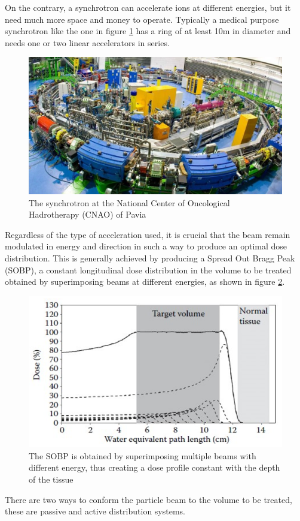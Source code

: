 On the contrary, a synchrotron can accelerate ions at different energies, but it need much more space and money to operate.
Typically a medical purpose synchrotron like the one in figure \ref{fig:sincrotrone} has a ring of at least 10m in diameter and needs one or two linear accelerators in series.
\begin{figure}[H]
	\centering
	\includegraphics[width=0.7\linewidth]{IMG/ch1/Sincrotrone}
	\caption{The synchrotron at the National Center of Oncological Hadrotherapy (CNAO) of Pavia}
	\label{fig:sincrotrone}
\end{figure}
\noindent Regardless of the type of acceleration used, it is crucial that the beam remain modulated in energy and direction in such a way to produce an optimal dose distribution. This is generally achieved by producing a Spread Out Bragg Peak (SOBP), a constant longitudinal dose distribution in the volume to be treated obtained by superimposing beams at different energies, as shown in figure \ref{fig:sobp}.
\begin{figure}[H]
	\centering
	\includegraphics[width=0.7\linewidth]{IMG/ch1/SOBP}
	\caption{The SOBP is obtained by superimposing multiple beams with different energy, thus creating a dose profile constant with the depth of the tissue}
	\label{fig:sobp}
\end{figure}
\noindent There are two ways to conform the particle beam to the volume to be treated, these are passive and active distribution systems.

